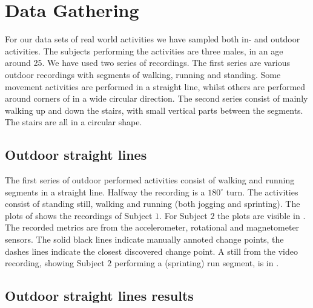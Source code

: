 \section{Data Gathering}\label{sec:data_gathering}
For our data sets of real world activities we have sampled both in- and outdoor activities.
The subjects performing the activities are three males, in an age around 25.
We have used two series of recordings.
The first series are various outdoor recordings with segments of walking, running and standing.
Some movement activities are performed in a straight line, whilst others are performed around corners of in a wide circular direction.
The second series consist of mainly walking up and down the stairs, with small vertical parts between the segments.
The stairs are all in a circular shape.

\subsection{Outdoor straight lines}\label{subsec:outdoor_straight}
The first series of outdoor performed activities consist of walking and running segments in a straight line.
Halfway the recording is a $180^{\circ}$ turn.
The activities consist of standing still, walking and running (both jogging and sprinting).
The plots of  shows the recordings of Subject $1$.
For Subject $2$ the plots are visible in .
The recorded metrics are from the accelerometer, rotational and magnetometer sensors.
The solid black lines indicate manually annoted change points, the dashes lines indicate the closest discovered change point.
A still from the video recording, showing Subject $2$ performing a (sprinting) run segment, is in .

\subsection{Outdoor straight lines results}

